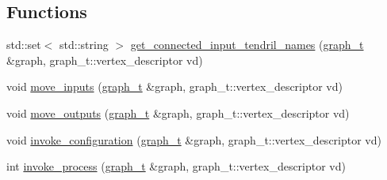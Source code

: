 \subsection*{Functions}
\begin{DoxyCompactItemize}
\item 
std\-::set$<$ std\-::string $>$ \hyperlink{namespaceecto_1_1graph_a3313c6217262c9d746a5f80d0a4708d7}{get\-\_\-connected\-\_\-input\-\_\-tendril\-\_\-names} (\hyperlink{structecto_1_1graph_1_1graph__t}{graph\-\_\-t} \&graph, graph\-\_\-t\-::vertex\-\_\-descriptor vd)
\item 
void \hyperlink{namespaceecto_1_1graph_a6a06bfc5757345d0a4531988e8125197}{move\-\_\-inputs} (\hyperlink{structecto_1_1graph_1_1graph__t}{graph\-\_\-t} \&graph, graph\-\_\-t\-::vertex\-\_\-descriptor vd)
\item 
void \hyperlink{namespaceecto_1_1graph_a540b97ac69ca6f09dfe9a60e1ebd5a1e}{move\-\_\-outputs} (\hyperlink{structecto_1_1graph_1_1graph__t}{graph\-\_\-t} \&graph, graph\-\_\-t\-::vertex\-\_\-descriptor vd)
\item 
void \hyperlink{namespaceecto_1_1graph_a13df50b98a1c4fe0d35ce7a3ea7316e1}{invoke\-\_\-configuration} (\hyperlink{structecto_1_1graph_1_1graph__t}{graph\-\_\-t} \&graph, graph\-\_\-t\-::vertex\-\_\-descriptor vd)
\item 
int \hyperlink{namespaceecto_1_1graph_a0b293971d5460ed370597d2e7c5d0b9c}{invoke\-\_\-process} (\hyperlink{structecto_1_1graph_1_1graph__t}{graph\-\_\-t} \&graph, graph\-\_\-t\-::vertex\-\_\-descriptor vd)
\end{DoxyCompactItemize}


